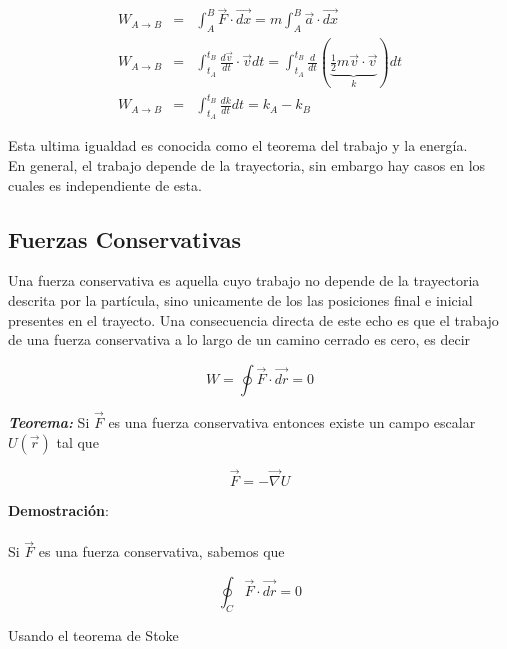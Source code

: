 \documentclass[12pt]{report}
\begin{document}
\begin{eqnarray} \nonumber
 W_{A \rightarrow B} &=& \int_{A}^B \vec{F} \cdot \vec{dx} = m \int_{A}^B \vec{a} \cdot \vec{dx} \\ \nonumber
 W_{A \rightarrow B} &=& \int_{t_A}^{t_B} \frac{d\vec{v}}{dt} \cdot \vec{v}dt =  \int_{t_A}^{t_B} \frac{d}{dt} \left(\underbrace{ \frac{1}{2} m \vec{v} \cdot \vec{v}}_{k}\right)dt \\ \label{1.4}
W_{A \rightarrow B} &=& \int_{t_A}^{t_B} \frac{dk}{dt}dt = k_A - k_B
\end{eqnarray}

Esta ultima igualdad es conocida como el teorema del trabajo y la energía.\\


En general, el trabajo depende de la trayectoria, sin embargo hay casos en los cuales es independiente de esta.





\subsection{Fuerzas Conservativas}
Una fuerza conservativa es aquella cuyo trabajo no depende de la trayectoria descrita por la partícula, sino unicamente de los las posiciones final e inicial presentes en el trayecto. Una consecuencia directa de este echo es que el trabajo de una fuerza conservativa  a lo largo de un camino cerrado es cero, es decir

\begin{equation} \label{1.5}
W=\oint \vec{F} \cdot \vec{dr}=0
\end{equation}

\textbf{\textit{Teorema:}} Si $\vec{F}$ es una fuerza conservativa entonces existe un campo escalar $U(\vec{r})$ tal que 

\begin{equation} \label{1.6}
\vec{F}=-\vec{\nabla}{U}
\end{equation}

\textbf{Demostración}: \\
\\ 

Si $\vec{F}$ es una fuerza conservativa, sabemos que 


\begin{equation} \nonumber
\oint_{C} \vec{F} \cdot \vec{dr}=0
\end{equation}


Usando el teorema de Stoke
\end{document}
